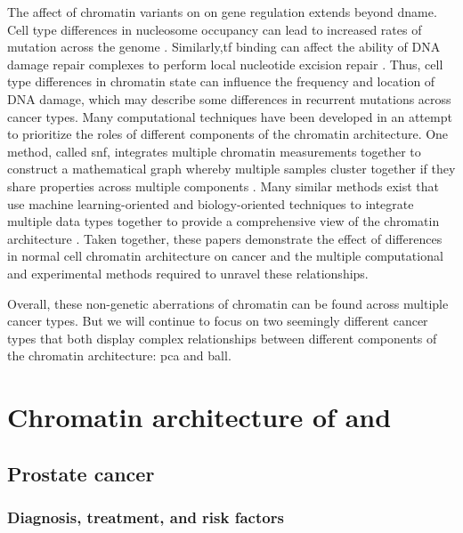 The affect of chromatin variants on on gene regulation extends beyond \gls{dname}.
Cell type differences in nucleosome occupancy can lead to increased rates of mutation across the genome \cite{pichSomaticGermlineMutation2018}.
Similarly,\gls{tf} binding can affect the ability of DNA damage repair complexes to perform local nucleotide excision repair \cite{sabarinathanNucleotideExcisionRepair2016,gonzalez_perezLocalDeterminantsMutational2019}.
Thus, cell type differences in chromatin state can influence the frequency and location of DNA damage, which may describe some differences in recurrent mutations across cancer types.
Many computational techniques have been developed in an attempt to prioritize the roles of different components of the chromatin architecture.
One method, called \gls{snf}, integrates multiple chromatin measurements together to construct a mathematical graph whereby multiple samples cluster together if they share properties across multiple components \cite{wangSimilarityNetworkFusion2014}.
Many similar methods exist that use machine learning-oriented and biology-oriented techniques to integrate multiple data types together to provide a comprehensive view of the chromatin architecture \cite{rappoportMultiomicMultiviewClustering2018}.
Taken together, these papers demonstrate the effect of differences in normal cell chromatin architecture on cancer and the multiple computational and experimental methods required to unravel these relationships.

Overall, these non-genetic aberrations of chromatin can be found across multiple cancer types.
But we will continue to focus on two seemingly different cancer types that both display complex relationships between different components of the chromatin architecture: \gls{pca} and \gls{ball}.

\section{Chromatin architecture of  and }

\subsection{Prostate cancer}

\subsubsection{Diagnosis, treatment, and risk factors}

